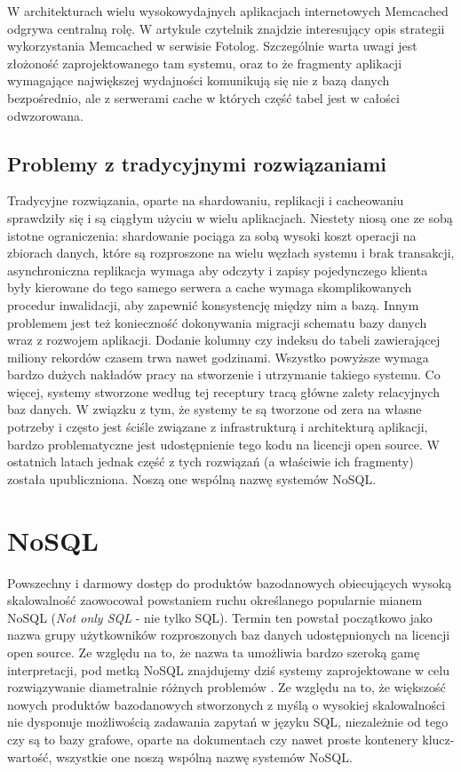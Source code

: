 W architekturach wielu wysokowydajnych aplikacjach internetowych Memcached odgrywa centralną rolę.
W artykule \cite{highscalability-mysql-memcached} czytelnik znajdzie interesujący opis strategii wykorzystania Memcached w serwisie Fotolog.
Szczególnie warta uwagi jest złożoność zaprojektowanego tam systemu, oraz to że fragmenty aplikacji wymagające największej wydajności komunikują się nie z bazą danych bezpośrednio, ale z serwerami cache w których część tabel jest w całości odwzorowana.

\subsection{Problemy z tradycyjnymi rozwiązaniami}

Tradycyjne rozwiązania, oparte na shardowaniu, replikacji i cacheowaniu sprawdziły się i są ciągłym użyciu w wielu aplikacjach.
Niestety niosą one ze sobą istotne ograniczenia: shardowanie pociąga za sobą wysoki koszt operacji na zbiorach danych, które są rozproszone na wielu węzłach systemu i brak transakcji, asynchroniczna replikacja wymaga aby odczyty i zapisy pojedynczego klienta były kierowane do tego samego serwera a cache wymaga skomplikowanych procedur inwalidacji, aby zapewnić konsystencję między nim a bazą.
Innym problemem jest też konieczność dokonywania migracji schematu bazy danych wraz z rozwojem aplikacji.
Dodanie kolumny czy indeksu do tabeli zawierającej miliony rekordów czasem trwa nawet godzinami.
Wszystko powyższe wymaga bardzo dużych nakładów pracy na stworzenie i utrzymanie takiego systemu.
Co więcej, systemy stworzone według tej receptury tracą główne zalety relacyjnych baz danych.
W związku z tym, że systemy te są tworzone od zera na własne potrzeby i często jest ściśle związane z infrastrukturą i architekturą aplikacji, bardzo problematyczne jest udostępnienie tego kodu na licencji open source.
W ostatnich latach jednak część z tych rozwiązań (a właściwie ich fragmenty) została upubliczniona.
Noszą one wspólną nazwę systemów NoSQL.

\section{NoSQL}
Powszechny i darmowy dostęp do produktów bazodanowych obiecujących wysoką skalowalność zaowocował powstaniem ruchu określanego popularnie mianem NoSQL (\emph{Not only SQL} - nie tylko SQL).
Termin ten powstał początkowo jako nazwa grupy użytkowników rozproszonych baz danych udostępnionych na licencji open source.
Ze względu na to, że nazwa ta umożliwia bardzo szeroką gamę interpretacji, pod metką NoSQL znajdujemy dziś systemy zaprojektowane w celu rozwiązywanie diametralnie różnych problemów \cite{evans-nosql-what-is-in-a-name}. 
Ze względu na to, że większość nowych produktów bazodanowych stworzonych z myślą o wysokiej skalowalności nie dysponuje możliwością zadawania zapytań w języku SQL, niezależnie od tego czy są to bazy grafowe, oparte na dokumentach czy nawet proste kontenery klucz-wartość, wszystkie one noszą wspólną nazwę systemów NoSQL.

